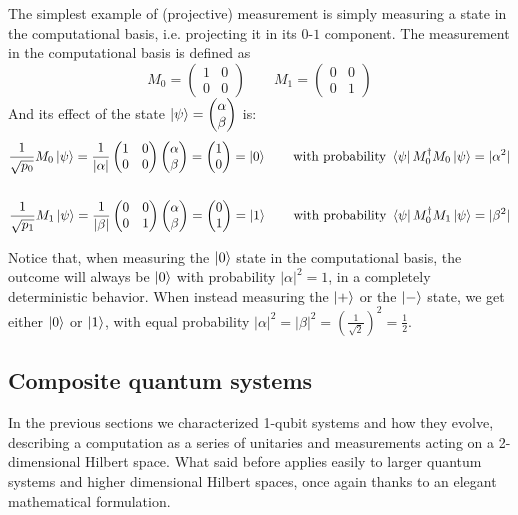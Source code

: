 \documentclass[10pt,a4paper, titlepage]{report}
\theoremstyle{definition}
\newcommand{\kp}{\ket{\psi}}
\newcommand{\kz}{\ket{0}}
\newcommand{\ko}{\ket{1}}
\newcommand{\kpl}{\ket{+}}
\newcommand{\oost}{\frac{1}{\sqrt{2}}}
\newcommand{\km}{\ket{-}}
\begin{document}
The simplest example of (projective) measurement is simply measuring a state in the computational basis, i.e. projecting it in its $0$-$1$ component. The measurement in the computational basis is defined as \[ M_0 = \begin{pmatrix} 1 & 0 \\ 0 & 0\end{pmatrix} \qquad
M_1 = \begin{pmatrix}0 & 0 \\ 0 & 1\end{pmatrix} \]
And its effect of the state $\kp = \begin{pmatrix}\alpha \\ \beta \end{pmatrix}$ is:
\begin{align*}
\frac{1}{\sqrt{p_0}}M_0\kp = \frac{1}{|\alpha|}\begin{pmatrix} 1 & 0 \\ 0 & 0\end{pmatrix}
\begin{pmatrix}\alpha \\ \beta \end{pmatrix} = \begin{pmatrix} 1 \\ 0 \end{pmatrix} = \kz 
\qquad \text{with probability } \bra{\psi}M_0^\dagger M_0\kp = |\alpha^2| \\
\\
\frac{1}{\sqrt{p_1}}M_1\kp = \frac{1}{|\beta|}\begin{pmatrix} 0 & 0 \\ 0 & 1\end{pmatrix}
\begin{pmatrix}\alpha \\ \beta \end{pmatrix} = \begin{pmatrix} 0 \\ 1 \end{pmatrix} = \ko 
\qquad \text{with probability } \bra{\psi}M_0^\dagger M_1\kp = |\beta^2|
\end{align*}

Notice that, when measuring the $\kz$ state in the computational basis, the outcome will always be $\kz$ with probability $|\alpha|^2 = 1$, in a completely deterministic behavior. 
When instead measuring the $\kpl$ or the $\km$ state, we get either $\kz$ or $\ko$, with equal probability $|\alpha|^2 = |\beta|^2 = \left(\oost\right)^2 = \frac{1}{2}$.
\subsection{Composite quantum systems}
In the previous sections we characterized 1-qubit systems and how they evolve, describing a computation as a series of unitaries and measurements acting on a 2-dimensional Hilbert space. What said before applies easily to larger quantum systems and higher dimensional Hilbert spaces, once again thanks to an elegant mathematical formulation.
\end{document}
